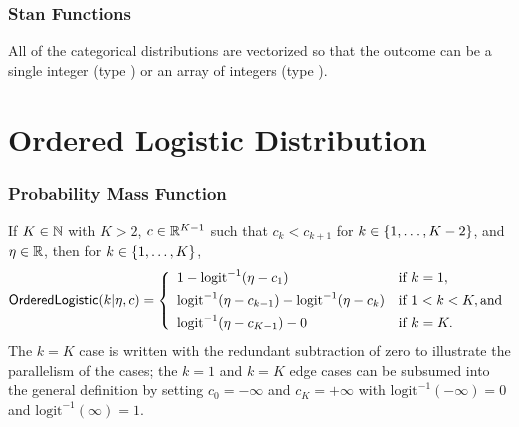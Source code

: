 \subsubsection{Stan Functions}

All of the categorical distributions are vectorized so that the
outcome  can be a single integer (type ) or an array
of integers (type ).


\begin{description}
%
%
\end{description}
%
\begin{description}
\end{description}



\section{Ordered Logistic Distribution}

\subsubsection{Probability Mass Function}

If $K \in \nats$ with $K > 2$, $c \in \reals^{K-1}$ such that $c_k <
c_{k+1}$ for $k \in \setlist{1,\ldots,K-2}$, and $\eta \in \reals$, then for $k \in
\setlist{1,\ldots,K}$,
\[
\distro{OrderedLogistic}(k|\eta,c)
=
\left\{
\begin{array}{ll}
1 - \mbox{logit}^{-1}(\eta - c_1) & \mbox{if } k = 1,
\\[4pt]
\mbox{logit}^{-1}(\eta - c_{k-1}) - \mbox{logit}^{-1}(\eta -
c_{k})

& \mbox{if } 1 < k < K, \mbox{and}
\\[4pt]
\mbox{logit}^{-1}(\eta - c_{K-1}) - 0
& \mbox{if } k = K.
\end{array}
\right.
\]
%
The $k=K$ case is written with the redundant subtraction of zero to
illustrate the parallelism of the cases; the $k=1$ and $k=K$ edge
cases can be subsumed into the general definition by setting $c_0 =
-\infty$ and $c_K = +\infty$ with $\mbox{logit}^{-1}(-\infty) = 0$ and
$\mbox{logit}^{-1}(\infty) = 1$.

